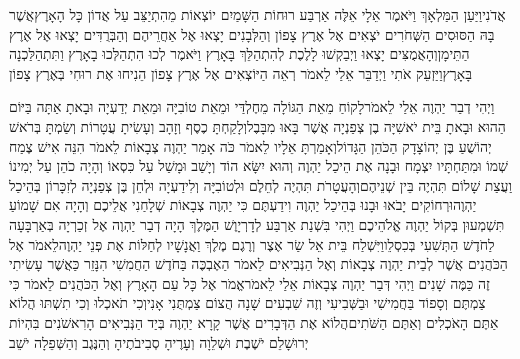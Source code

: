 \documentclass[../main/main.tex]{subfiles}
\begin{document}
\begin{multicols*}{\ncols}
אֲדֹנִי\PreVerseSpace{}וַיַּעַן הַמַּלְאָךְ וַיֹּאמֶר אֵלָי אֵלֶּה אַרְבַּע רוּחוֹת הַשָּׁמַיִם יוֹצְאוֹת מֵהִתְיַצֵּב עַל אֲדוֹן כָּל הָאָרֶץ\PreVerseSpace{}אֲשֶׁר בָּהּ הַסּוּסִים הַשְּׁחֹרִים יֹצְאִים אֶל אֶרֶץ צָפוֹן וְהַלְּבָנִים יָצְאוּ אֶל אַחֲרֵיהֶם וְהַבְּרֻדִּים יָצְאוּ אֶל אֶרֶץ הַתֵּימָן\PreVerseSpace{}וְהָאֲמֻצִּים יָצְאוּ וַיְבַקְשׁוּ לָלֶכֶת לְהִתְהַלֵּךְ בָּאָרֶץ וַיֹּאמֶר לְכוּ הִתְהַלְּכוּ בָאָרֶץ וַתִּתְהַלַּכְנָה בָּאָרֶץ\PreVerseSpace{}וַיַּזְעֵק אֹתִי וַיְדַבֵּר אֵלַי לֵאמֹר רְאֵה הַיּוֹצְאִים אֶל אֶרֶץ צָפוֹן הֵנִיחוּ אֶת רוּחִי בְּאֶרֶץ צָפוֹן\OpenSection{}\par
{}וַיְהִי דְבַר יַהְוֶה אֵלַי לֵאמֹר\PreVerseSpace{}לָקוֹחַ מֵאֵת הַגּוֹלָה מֵחֶלְדַּי וּמֵאֵת טוֹבִיָּה וּמֵאֵת יְדַעְיָה וּבָאתָ אַתָּה בַּיּוֹם הַהוּא וּבָאתָ בֵּית יֹאשִׁיָּה בֶן צְפַנְיָה אֲשֶׁר בָּאוּ מִבָּבֶל\PreVerseSpace{}וְלָקַחְתָּ כֶסֶף וְזָהָב וְעָשִׂיתָ עֲטָרוֹת וְשַׂמְתָּ בְּרֹאשׁ יְהוֹשֻׁעַ בֶּן יְהוֹצָדָק הַכֹּהֵן הַגָּדוֹל\PreVerseSpace{}וְאָמַרְתָּ אֵלָיו לֵאמֹר כֹּה אָמַר יַהְוֶה צְבָאוֹת לֵאמֹר הִנֵּה אִישׁ צֶמַח שְׁמוֹ וּמִתַּחְתָּיו יִצְמָח וּבָנָה אֶת הֵיכַל יַהְוֶה\PreVerseSpace{} וְהוּא יִשָּׂא הוֹד וְיָשַׁב וּמָשַׁל עַל כִּסְאוֹ וְהָיָה כֹהֵן עַל יְמִינוֹ\SubEnd{} וַעֲצַת שָׁלוֹם תִּהְיֶה בֵּין שְׁנֵיהֶם\PreVerseSpace{}וְהָעֲטָרֹת תִּהְיֶה לְחֵלֶם וּלְטוֹבִיָּה וְלִידַעְיָה וּלְחֵן בֶּן צְפַנְיָה לְזִכָּרוֹן בְּהֵיכַל יַהְוֶה\PreVerseSpace{}וּרְחוֹקִים יָבֹאוּ וּבָנוּ בְּהֵיכַל יַהְוֶה וִידַעְתֶּם כִּי יַהְוֶה צְבָאוֹת שְׁלָחַנִי אֲלֵיכֶם וְהָיָה אִם שָׁמוֹעַ תִּשְׁמְעוּן בְּקוֹל יַהְוֶה אֱלֹהֵיכֶם \ClosedSection{}וַיְהִי בִּשְׁנַת אַרְבַּע לְדָרְיָוֶשׁ הַמֶּלֶךְ הָיָה דְבַר יַהְוֶה אֶל זְכַרְיָה בְּאַרְבָּעָה לַחֹדֶשׁ הַתְּשִׁעִי בְּכִסְלֵו\PreVerseSpace{}וַיִּשְׁלַח בֵּית אֵל שַׂר אֶצֶר וְרֶגֶם מֶלֶךְ וַאֲנָשָׁיו לְחַלּוֹת אֶת פְּנֵי יַהְוֶה\PreVerseSpace{}לֵאמֹר אֶל הַכֹּהֲנִים אֲשֶׁר לְבֵית יַהְוֶה צְבָאוֹת וְאֶל הַנְּבִיאִים לֵאמֹר הַאֶבְכֶּה בַּחֹדֶשׁ הַחֲמִשִׁי הִנָּזֵר כַּאֲשֶׁר עָשִׂיתִי זֶה כַּמֶּה שָׁנִים \ClosedSection{}וַיְהִי דְּבַר יַהְוֶה צְבָאוֹת אֵלַי לֵאמֹר\PreVerseSpace{}אֱמֹר אֶל כָּל עַם הָאָרֶץ וְאֶל הַכֹּהֲנִים לֵאמֹר כִּי צַמְתֶּם וְסָפוֹד בַּחֲמִישִׁי וּבַשְּׁבִיעִי וְזֶה שִׁבְעִים שָׁנָה הֲצוֹם צַמְתֻּנִי אָנִי\PreVerseSpace{}וְכִי תֹאכְלוּ וְכִי תִשְׁתּוּ הֲלוֹא אַתֶּם הָאֹכְלִים וְאַתֶּם הַשֹּׁתִים\PreVerseSpace{}הֲלוֹא אֶת הַדְּבָרִים אֲשֶׁר קָרָא יַהְוֶה בְּיַד הַנְּבִיאִים הָרִאשֹׁנִים בִּהְיוֹת יְרוּשָׁלֵם יֹשֶׁבֶת וּשְׁלֵוָה וְעָרֶיהָ סְבִיבֹתֶיהָ וְהַנֶּגֶב וְהַשְּׁפֵלָה יֹשֵׁב\OpenSection{}\par

\end{multicols*}
\end{document}
